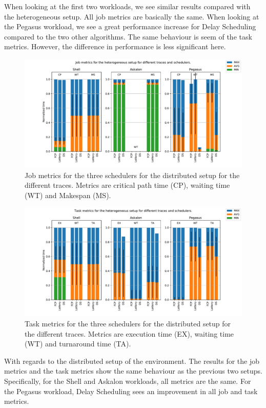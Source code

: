\documentclass{article}
\begin{document}
When looking at the first two workloads, we see similar results compared with the heterogeneous setup. All job metrics are basically the same. When looking at the Pegasus workload, we see a great performance increase for Delay Scheduling compared to the two other algorithms. The same behaviour is seem of the task metrics. However, the difference in performance is less significant here. 

\begin{figure}[H]
    \centering
    \centerline{\includegraphics[width=.8\textwidth]{setup-heterogeneous_job.pdf}}
    \caption{Job metrics for the three schedulers for the distributed setup for the different traces. Metrics are critical path time (CP), waiting time (WT) and Makespan (MS).}
    \label{fig:setup-distributed_job}
\end{figure}

\begin{figure}[H]
    \centering
    \centerline{\includegraphics[width=.8\textwidth]{setup-heterogeneous_task.pdf}}
    \caption{Task metrics for the three schedulers for the distributed setup for the different traces. Metrics are execution time (EX), waiting time (WT) and turnaround time (TA).}
    \label{fig:setup-distributed_task}
\end{figure}

With regards to the distributed setup of the environment. The results for the job metrics and the task metrics show the same behaviour as the previous two setups. Specifically, for the Shell and Askalon workloads, all metrics are the same. For the Pegasus workload, Delay Scheduling sees an improvement in all job and task metrics. 
\end{document}
